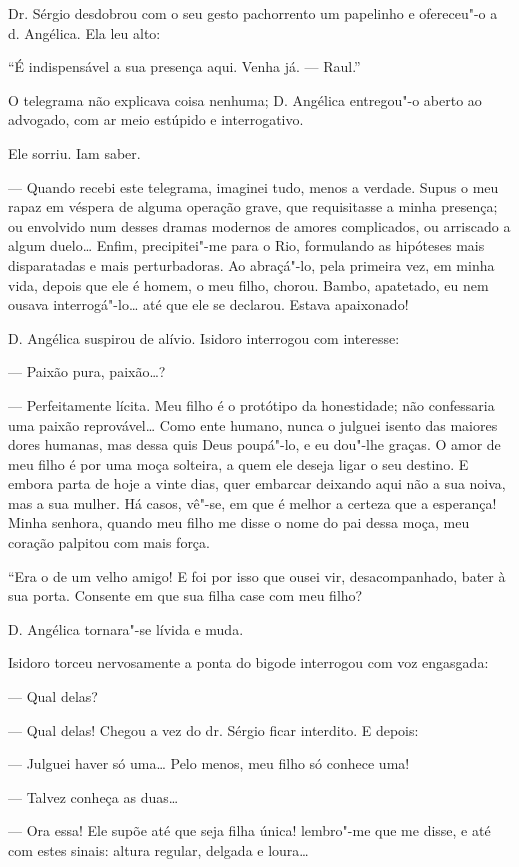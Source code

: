 Dr. Sérgio desdobrou com o seu gesto pachorrento um papelinho e
ofereceu"-o a d. Angélica. Ela leu alto:

``É indispensável a sua presença aqui. Venha já. --- Raul.''

O telegrama não explicava coisa nenhuma; D. Angélica entregou"-o aberto
ao advogado, com ar meio estúpido e interrogativo.

Ele sorriu. Iam saber.

--- Quando recebi este telegrama, imaginei tudo, menos a verdade. Supus
o meu rapaz em véspera de alguma operação grave, que requisitasse a
minha presença; ou envolvido num desses dramas modernos de amores
complicados, ou arriscado a algum duelo\ldots{} Enfim, precipitei"-me para o
Rio, formulando as hipóteses mais disparatadas e mais perturbadoras. Ao
abraçá"-lo, pela primeira vez, em minha vida, depois que ele é homem, o
meu filho, chorou. Bambo, apatetado, eu nem ousava interrogá"-lo\ldots{} até
que ele se declarou. Estava apaixonado!

D. Angélica suspirou de alívio. Isidoro interrogou com interesse:

--- Paixão pura, paixão\ldots{}?

--- Perfeitamente lícita. Meu filho é o protótipo da honestidade; não
confessaria uma paixão reprovável\ldots{} Como ente humano, nunca o julguei
isento das maiores dores humanas, mas dessa quis Deus poupá"-lo, e eu
dou"-lhe graças. O amor de meu filho é por uma moça solteira, a quem ele
deseja ligar o seu destino. E embora parta de hoje a vinte dias, quer
embarcar deixando aqui não a sua noiva, mas a sua mulher. Há casos,
vê"-se, em que é melhor a certeza que a esperança! Minha senhora, quando
meu filho me disse o nome do pai dessa moça, meu coração palpitou com
mais força.

``Era o de um velho amigo! E foi por isso que ousei vir, desacompanhado,
bater à sua porta. Consente em que sua filha case com meu filho?

D. Angélica tornara"-se lívida e muda.

Isidoro torceu nervosamente a ponta do bigode interrogou com voz
engasgada:

--- Qual delas?

--- Qual delas! Chegou a vez do dr. Sérgio ficar interdito. E depois:

--- Julguei haver só uma\ldots{} Pelo menos, meu filho só conhece uma!

--- Talvez conheça as duas\ldots{}

--- Ora essa! Ele supõe até que seja filha única! lembro"-me que me
disse, e até com estes sinais: altura regular, delgada e loura\ldots{}

